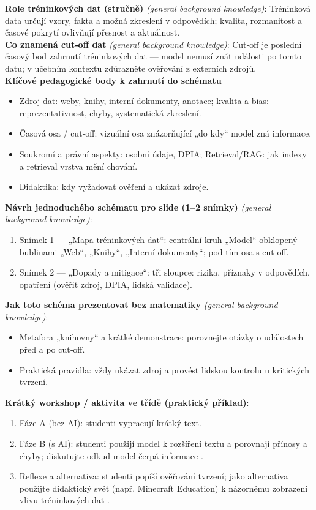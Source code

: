 \noindent\textbf{Role tréninkových dat (stručně)} \emph{(general background knowledge)}: Tréninková data určují vzory, fakta a možná zkreslení v odpovědích; kvalita, rozmanitost a časové pokrytí ovlivňují přesnost a aktuálnost.\\[6pt]
\noindent\textbf{Co znamená cut‑off dat} \emph{(general background knowledge)}: Cut‑off je poslední časový bod zahrnutí tréninkových dat — model nemusí znát události po tomto datu; v učebním kontextu zdůrazněte ověřování z externích zdrojů.\\[6pt]
\noindent\textbf{Klíčové pedagogické body k zahrnutí do schématu} \begin{itemize}
  \item Zdroj dat: weby, knihy, interní dokumenty, anotace; kvalita a bias: reprezentativnost, chyby, systematická zkreslení.
  \item Časová osa / cut‑off: vizuální osa znázorňující „do kdy“ model zná informace.
  \item Soukromí a právní aspekty: osobní údaje, DPIA; Retrieval/RAG: jak indexy a retrieval vrstva mění chování.
  \item Didaktika: kdy vyžadovat ověření a ukázat zdroje.
\end{itemize}
\noindent\textbf{Návrh jednoduchého schématu pro slide (1–2 snímky)} \emph{(general background knowledge)}: \begin{enumerate}
  \item Snímek 1 — „Mapa tréninkových dat“: centrální kruh „Model“ obklopený bublinami „Web“, „Knihy“, „Interní dokumenty“; pod tím osa s cut‑off.
  \item Snímek 2 — „Dopady a mitigace“: tři sloupce: rizika, příznaky v odpovědích, opatření (ověřit zdroj, DPIA, lidská validace).
\end{enumerate}
\noindent\textbf{Jak toto schéma prezentovat bez matematiky} \emph{(general background knowledge)}: \begin{itemize}
  \item Metafora „knihovny“ a krátké demonstrace: porovnejte otázky o událostech před a po cut‑off.
  \item Praktická pravidla: vždy ukázat zdroj a provést lidskou kontrolu u kritických tvrzení.
\end{itemize}
\noindent\textbf{Krátký workshop / aktivita ve třídě (praktický příklad)}: \begin{enumerate}
  \item Fáze A (bez AI): studenti vypracují krátký text.
  \item Fáze B (s AI): studenti použijí model k rozšíření textu a porovnají přínosy a chyby; diskutujte odkud model čerpá informace \cite{kb_malinka_chatgpt_ve_vyuce_dva_roky_pote_2024_pdf_90bc3aaf_page_12_1}.
  \item Reflexe a alternativa: studenti popíší ověřování tvrzení; jako alternativa použijte didaktický svět (např. Minecraft Education) k názornému zobrazení vlivu tréninkových dat \cite{kb_ai_101_tipu_pdf_04e4a115_page_15_2}.
\end{enumerate}
